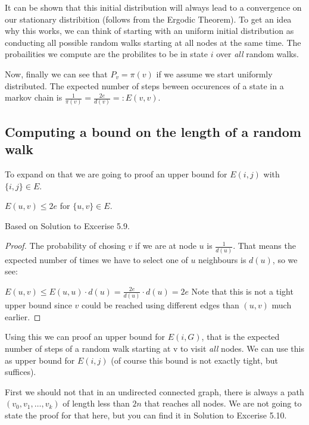 It can be shown that this initial distribution will always lead to a
convergence on our stationary distribition (follows from the Ergodic
Theorem). To get an idea why this works, we can think of starting with
an uniform initial distribution as conducting all possible random walks
starting at all nodes at the same time. The probailities we compute are
the probilites to be in state $i$ over \emph{all} random walks.

Now, finally we can see that $P_v = \pi(v)$ if we assume we start
uniformly distributed. The expected number of steps beween occurences of
a state in a markov chain is
$\frac{1}{\pi(v)} = \frac{2e}{d(v)} =: E(v, v)$.

\subsection{Computing a bound on the length of a random
walk}\label{computing-a-bound-on-the-length-of-a-random-walk}

To expand on that we are going to proof an upper bound for $E(i, j)$
with $\{i, j\} \in E$.

\vspace{0.5cm}

\begin{thm}
$E(u, v) \leq 2e$ for $\{u, v\} \in E$.
\end{thm}

Based on  Solution to Excerise
5.9.

\begin{proof}
The probability of chosing $v$ if we are at node $u$ is $\frac{1}{d(u)}$.
That means the expected number of times we have to select one of $u$ neighbours is $d(u)$,
so we see:

$E(u, v) \leq E(u, u) \cdot d(u) = \frac{2e}{d(u)} \cdot d(u) = 2e$
Note that this is not a tight upper bound since $v$ could be reached using different edges than $(u, v)$ much earlier.
\end{proof}

Using this we can proof an upper bound for $E(i, G)$, that is the
expected number of steps of a random walk starting at v to visit
\emph{all} nodes. We can use this as upper bound for $E(i, j)$ (of
course this bound is not exactly tight, but suffices).

First we should not that in an undirected connected graph, there is
always a path $(v_0, v_1, \dots, v_k)$ of length less than $2n$ that
reaches all nodes. We are not going to state the proof for that here,
but you can find it in  Solution
to Excerise 5.10.

